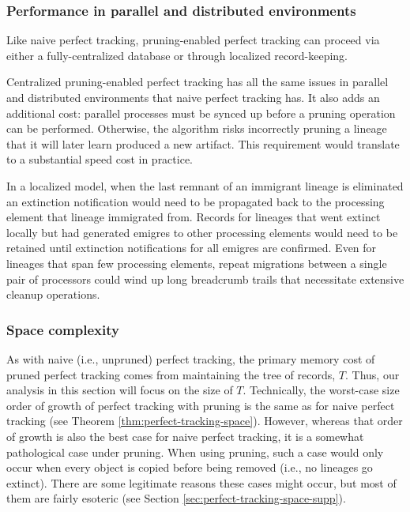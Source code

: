 \subsubsection{Performance in parallel and distributed environments}
\label{sec:perfect-tracking-pruning-distrbuted}

Like naive perfect tracking, pruning-enabled perfect tracking can proceed via either a fully-centralized database or through localized record-keeping.

Centralized pruning-enabled perfect tracking has all the same issues in parallel and distributed environments that naive perfect tracking has.
It also adds an additional cost: parallel processes must be synced up before a pruning operation can be performed.
Otherwise, the algorithm risks incorrectly pruning a lineage that it will later learn produced a new artifact.
This requirement would translate to a substantial speed cost in practice.

In a localized model, when the last remnant of an immigrant lineage is eliminated an extinction notification would need to be propagated back to the processing element that lineage immigrated from.
Records for lineages that went extinct locally but had generated emigres to other processing elements would need to be retained until extinction notifications for all emigres are confirmed.
Even for lineages that span few processing elements, repeat migrations between a single pair of processors could wind up long breadcrumb trails that necessitate extensive cleanup operations.

\subsubsection{Space complexity}
\label{sec:perfect-tracking-pruning-space}

As with naive (i.e., unpruned) perfect tracking, the primary memory cost of pruned perfect tracking comes from maintaining the tree of records, $T$.
Thus, our analysis in this section will focus on the size of $T$.
Technically, the worst-case size order of growth of perfect tracking with pruning is the same as for naive perfect tracking (see Theorem \ref{thm:perfect-tracking-space}).
However, whereas that order of growth is also the best case for naive perfect tracking, it is a somewhat pathological case under pruning.
When using pruning, such a case would only occur when every object is copied before being removed (i.e., no lineages go extinct).
There are some legitimate reasons these cases might occur, but most of them are fairly esoteric (see Section \ref{sec:perfect-tracking-space-supp}).

